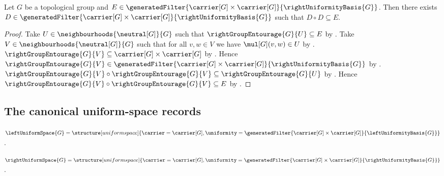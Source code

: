 \begin{proposition}\label{right_generated_uniformity_square}
    Let $G$ be a topological group and
        $E\in\generatedFilter
            {\carrier[G]\times\carrier[G]}{\rightUniformityBasis{G}}$.
    Then there exists $D\in\generatedFilter
        {\carrier[G]\times\carrier[G]}{\rightUniformityBasis{G}}$ such that
        $D\circ D\subseteq E$.
\end{proposition}
\begin{proof}
    Take $U\in\neighbourhoods{\neutral[G]}{G}$ such that
        $\rightGroupEntourage{G}{U}\subseteq E$
        by .
    Take $V\in\neighbourhoods{\neutral[G]}{G}$ such that
        for all $v,w\in V$ we have $\mul[G](v,w)\in U$
        by
        .
    $\rightGroupEntourage{G}{V}\subseteq\carrier[G]\times\carrier[G]$
        by .
    Hence $\rightGroupEntourage{G}{V}\in\generatedFilter
        {\carrier[G]\times\carrier[G]}{\rightUniformityBasis{G}}$
        by .
    $\rightGroupEntourage{G}{V}\circ\rightGroupEntourage{G}{V}
        \subseteq\rightGroupEntourage{G}{U}$
        by .
    Hence $\rightGroupEntourage{G}{V}\circ\rightGroupEntourage{G}{V}
        \subseteq E$ by .
\end{proof}

\subsection{The canonical uniform-space records}

\begin{definition}\label{left_uniform_space}
    $\leftUniformSpace{G}=
        \structure[uniform space]{
            \carrier=\carrier[G],
            \uniformity=\generatedFilter
                {\carrier[G]\times\carrier[G]}{\leftUniformityBasis{G}}
        }$.
\end{definition}

\begin{definition}\label{right_uniform_space}
    $\rightUniformSpace{G}=
        \structure[uniform space]{
            \carrier=\carrier[G],
            \uniformity=\generatedFilter
                {\carrier[G]\times\carrier[G]}{\rightUniformityBasis{G}}
        }$.
\end{definition}

